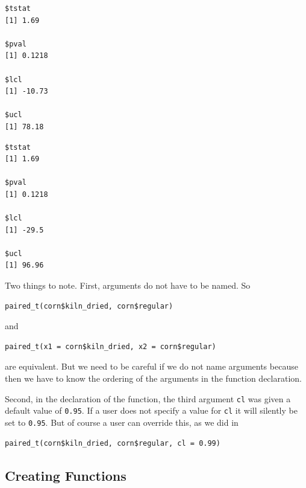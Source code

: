 \documentclass[]{krantz}
\makeatletter
\newenvironment{Shaded}{\begin{snugshade}}{\end{snugshade}}
\newcommand{\DataTypeTok}[1]{\textcolor[rgb]{0.27,0.27,0.27}{#1}}
\newcommand{\FloatTok}[1]{\textcolor[rgb]{0.06,0.06,0.06}{#1}}
\newcommand{\KeywordTok}[1]{\textcolor[rgb]{0.27,0.27,0.27}{\textbf{#1}}}
\newcommand{\NormalTok}[1]{#1}
\newcommand{\OperatorTok}[1]{\textcolor[rgb]{0.43,0.43,0.43}{\textbf{#1}}}
\newcommand{\StringTok}[1]{\textcolor[rgb]{0.5,0.5,0.5}{#1}}
\newenvironment{kframe}{%
\medskip{}
\setlength{\fboxsep}{.8em}
 \def\at@end@of@kframe{}%
 \ifinner\ifhmode%
  \def\at@end@of@kframe{\end{minipage}}%
  \begin{minipage}{\columnwidth}%
 \fi\fi%
 \def\FrameCommand##1{\hskip\@totalleftmargin \hskip-\fboxsep
 \colorbox{shadecolor}{##1}\hskip-\fboxsep
     \hskip-\linewidth \hskip-\@totalleftmargin \hskip\columnwidth}%
 \MakeFramed {\advance\hsize-\width
   \@totalleftmargin\z@ \linewidth\hsize
   \@setminipage}}%
 {\par\unskip\endMakeFramed%
 \at@end@of@kframe}
\renewenvironment{Shaded}{\begin{kframe}}{\end{kframe}}
\makeatother
\begin{document}
\begin{verbatim}
$tstat
[1] 1.69

$pval
[1] 0.1218

$lcl
[1] -10.73

$ucl
[1] 78.18
\end{verbatim}

\begin{Shaded}
\end{Shaded}

\begin{verbatim}
$tstat
[1] 1.69

$pval
[1] 0.1218

$lcl
[1] -29.5

$ucl
[1] 96.96
\end{verbatim}

Two things to note. First, arguments do not have to be named. So

\begin{verbatim}
paired_t(corn$kiln_dried, corn$regular)
\end{verbatim}

and

\begin{verbatim}
paired_t(x1 = corn$kiln_dried, x2 = corn$regular)
\end{verbatim}

are equivalent. But we need to be careful if we do not name arguments because then we have to know the ordering of the arguments in the function declaration.

Second, in the declaration of the function, the third argument \texttt{cl} was given a default value of \texttt{0.95}. If a user does not specify a value for \texttt{cl} it will silently be set to \texttt{0.95}. But of course a user can override this, as we did in

\begin{verbatim}
paired_t(corn$kiln_dried, corn$regular, cl = 0.99)
\end{verbatim}

\hypertarget{creating-functions}{%
\subsection{Creating Functions}\label{creating-functions}}
\end{document}
